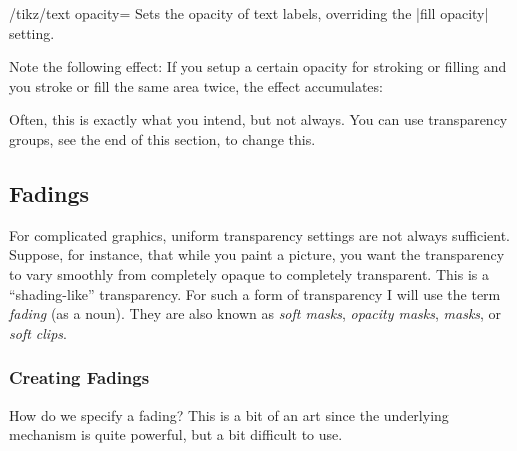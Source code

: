 \begin{key}{/tikz/text opacity=}
  Sets the opacity of text labels, overriding the |fill opacity| setting.
\begin{codeexample}[]
\end{codeexample}
\end{key}


Note the following effect: If you setup a certain opacity for stroking
or filling and you stroke or fill the same area twice, the effect
accumulates:

\begin{codeexample}[]
\end{codeexample}

Often, this is exactly what you intend, but not always. You can use
transparency groups, see the end of this section, to change this.


\subsection{Fadings}

For complicated graphics, uniform transparency settings are not always
sufficient. Suppose, for instance, that while you paint a picture, you
want the transparency to vary smoothly from completely opaque to
completely transparent. This is a ``shading-like'' transparency. For
such a form of transparency I will use the term \emph{fading} (as a
noun). They are also known as \emph{soft masks}, \emph{opacity masks},
\emph{masks}, or \emph{soft clips}.


\subsubsection{Creating Fadings}

How do we specify a fading? This is a bit of an art since the
underlying mechanism is quite powerful, but a bit difficult to use.

